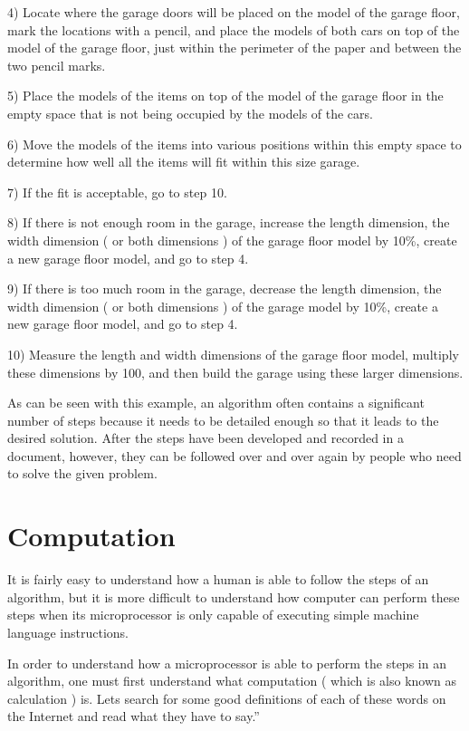 \documentclass[12pt,oneside]{book}
\begin{document}
4) Locate where the garage doors will be placed on the model of the garage floor, mark the locations with a pencil, and place the models of both cars on top of the model of the garage floor, just within the perimeter of the paper and between the two pencil marks. 

5) Place the models of the items on top of the model of the garage floor in the empty space that is not being occupied by the models of the cars. 

6) Move the models of the items into various positions within this empty space to determine how well all the items will fit within this size garage. 

7) If the fit is acceptable, go to step 10. 

8) If there is not enough room in the garage, increase the length dimension, the width dimension ( or both dimensions ) of the garage floor model by 10\%, create a new garage floor model, and go to step 4. 


9) If there is too much room in the garage, decrease the length dimension, the width dimension ( or both dimensions ) of the garage model by 10\%, create a new garage floor model, and go to step 4. 

10) Measure the length and width dimensions of the garage floor model, multiply these dimensions by 100, and then build the garage using these larger dimensions. 

As can be seen with this example, an algorithm often contains a significant number of steps because it needs to be detailed enough so that it leads to the desired solution. After the steps have been developed and recorded in a document, however, they can be followed over and over again by people who need to solve the given problem.

\section[Computation]{Computation}

It is fairly easy to understand how a human is able to follow the steps of an algorithm, but it is more difficult to understand how computer can perform these steps when its microprocessor is only capable of executing simple machine language instructions. 

In order to understand how a microprocessor is able to perform the steps in an algorithm, one must first understand what computation ( which is also known as calculation ) is. Lets search for some good definitions of each of these words on the Internet and read what they have to say.'' 
\end{document}
